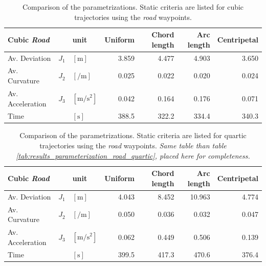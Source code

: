 \begin{table}[h]
\begin{center}
 \begin{tabular}{lll|rrrr}
 \hline
 Cubic \textit{Road} & & unit & Uniform & Chord length & Arc length & Centripetal \\ \hline \hline
 Av. Deviation  & $J_1$ & $[\si{\meter}]$    & 3.859 & 4.477 & 4.903 & 3.650 \\
 Av. Curvature & $J_2$ & $[\si{\per\meter}]$ & 0.025 & 0.022 & 0.020 & 0.024 \\
 Av. Acceleration  & $J_3$ & $[\si{\meter\per\square\second}]$ &  0.042 & 0.164 & 0.176 & 0.071 \\
 Time      &   & $[\si{\second}]$ & 388.5 & 322.2 & 334.4 & 340.3 \\
 \hline
 \end{tabular}
 \caption{Comparison of the parametrizations. Static criteria are listed for cubic trajectories using the \textit{road} waypoints.}\vspace{1ex}
 \label{tab:app_results_parameterization_road_cubic}
\end{center}
\end{table}

\begin{table}[H]
\begin{center}
 \begin{tabular}{lll|rrrr}
 \hline
 Cubic \textit{Road} & & unit & Uniform & Chord length & Arc length & Centripetal \\ \hline \hline
 Av. Deviation  & $J_1$ & $[\si{\meter}]$    & 4.043 & 8.452 & 10.963 & 4.774 \\
 Av. Curvature & $J_2$ & $[\si{\per\meter}]$ & 0.050 & 0.036 & 0.032 & 0.047 \\
 Av. Acceleration  & $J_3$ & $[\si{\meter\per\square\second}]$ &  0.062 & 0.449 & 0.506 & 0.139 \\
 Time      &   & $[\si{\second}]$ &  399.5 & 417.3 & 470.6 & 376.4 \\
 \hline
 \end{tabular}
 \caption{Comparison of the parametrizations. Static criteria are listed for quartic trajectories using the \textit{road} waypoints. \textit{Same table than table \ref{tab:results_parameterization_road_quartic}, placed here for completeness.}}\vspace{1ex}
 \label{tab:app_results_parameterization_road_quartic}
\end{center}
\end{table}

